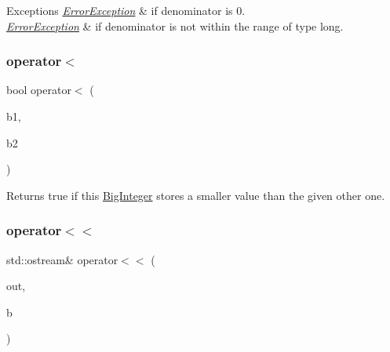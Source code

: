 \begin{DoxyExceptions}{Exceptions}
{\em \mbox{\hyperlink{classErrorException}{Error\+Exception}}} & if denominator is 0. \\
\hline
{\em \mbox{\hyperlink{classErrorException}{Error\+Exception}}} & if denominator is not within the range of type long. \\
\hline
\end{DoxyExceptions}
\mbox{\label{classBigInteger_a4dcc8676ab598fab3e5437c55b8dfaf5}} 
\subsubsection{\texorpdfstring{operator$<$}{operator<}}
{\footnotesize\ttfamily bool operator$<$ (\begin{DoxyParamCaption}\item[{const \mbox{\hyperlink{classBigInteger}{Big\+Integer}} \&}]{b1,  }\item[{const \mbox{\hyperlink{classBigInteger}{Big\+Integer}} \&}]{b2 }\end{DoxyParamCaption})\hspace{0.3cm}{\ttfamily [friend]}}



Returns true if this \mbox{\hyperlink{classBigInteger}{Big\+Integer}} stores a smaller value than the given other one. 

\mbox{\label{classBigInteger_ac88f101625fa13c9bbc286eb90eec023}} 
\subsubsection{\texorpdfstring{operator$<$$<$}{operator<<}}
{\footnotesize\ttfamily std\+::ostream\& operator$<$$<$ (\begin{DoxyParamCaption}\item[{std\+::ostream \&}]{out,  }\item[{const \mbox{\hyperlink{classBigInteger}{Big\+Integer}} \&}]{b }\end{DoxyParamCaption})\hspace{0.3cm}{\ttfamily [friend]}}




